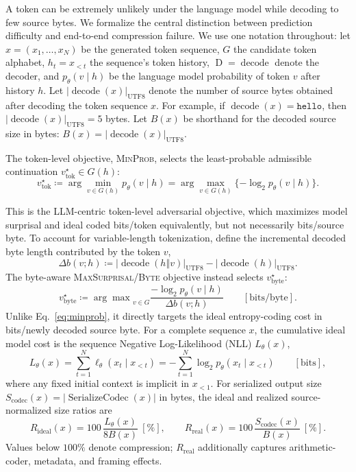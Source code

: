 \documentclass{article}
\newcommand{\MinProb}[0]{\textsc{MinProb}}
\newcommand{\MaxSurprisal}[0]{\textsc{MaxSurprisal/Byte}}
\newcommand{\bytes}[1]{\lvert #1\rvert_{\mathrm{UTF8}}}
\newcommand{\vtok}{v^\star_{\mathrm{tok}}}
\newcommand{\vbyte}{v^\star_{\mathrm{byte}}}
\newcommand{\Dec}{\operatorname{D}}
\newcommand{\Ser}{\operatorname{SerializeCodec}}
\begin{document}
A token can be extremely unlikely under the language model while decoding to few source bytes. We formalize the central distinction between prediction difficulty and end-to-end compression failure. We use one notation throughout: let $x=(x_1,\ldots,x_N)$ be the generated token sequence, $G$ the candidate token alphabet, $h_t=x_{<t}$ the sequence's token history, $\Dec = \operatorname{decode}$ denote the decoder, and $p_\theta(v\mid h)$ be the language model probability of token $v$ after history $h$. Let $\bytes{\operatorname{decode}(x)}$ denote the number of source bytes obtained after decoding the token sequence $x$. For example, if $\operatorname{decode}(x)=\texttt{hello}$, then $\bytes{\operatorname{decode}(x)}=5$ bytes.
Let $B(x)$ be shorthand for the decoded source size in bytes: $B(x) = \bytes{\operatorname{decode}(x)}.$

The token-level objective, \MinProb{}, selects the least-probable admissible continuation $\vtok \in G(h)$:
\begin{equation}
  \vtok \coloneq
     \arg\min_{v\in G(h)} p_\theta(v\mid h)
  = \arg\max_{v\in G(h)}
    \{-\log_2 p_\theta(v\mid h)\}.
  \label{eq:minprob}
\end{equation}

This is the LLM-centric token-level adversarial objective, which maximizes model surprisal and ideal coded bits/token equivalently, but not necessarily bits/source byte. To account for variable-length tokenization, define the incremental decoded byte length contributed by the token $v$,
\begin{equation}
  \Delta b(v;h) \coloneq
  \bytes{\operatorname{decode}(h\mathbin\Vert v)}-
  \bytes{\operatorname{decode}(h)}.
\end{equation}
The byte-aware \MaxSurprisal{} objective instead selects $\vbyte$:
\begin{equation}
  \vbyte \coloneq {\arg \max}_{v\in G}
  \frac{-\log_2 p_\theta(v\mid h)}{\Delta b(v;h)}  \qquad [\mathrm{bits/byte}].
  \label{eq:spb}
\end{equation}
Unlike Eq.~\eqref{eq:minprob}, it directly targets the ideal entropy-coding cost in bits/newly decoded source byte.
For a complete sequence $x$, the cumulative ideal model cost is the sequence Negative Log-Likelihood (NLL) $L_\theta(x)$,
\begin{equation}
  L_\theta(x)
  =
  \sum_{t=1}^{N}
  \ell_\theta(x_t\mid x_{<t})
  =
  -\sum_{t=1}^{N}\log_2 p_\theta(x_t\mid x_{<t})
  \qquad [\mathrm{bits}],
  \label{eq:nll}
\end{equation}
where any fixed initial context is implicit in $x_{<1}$. For serialized output
size $S_{\mathrm{codec}}(x)=\left|\Ser(x)\right|$ in bytes, the ideal and
realized source-normalized size ratios are
\begin{equation}
  R_{\mathrm{ideal}}(x)=100\,\frac{L_\theta(x)}{8B(x)}\ [\%],
  \qquad
  R_{\mathrm{real}}(x)=100\,\frac{S_{\mathrm{codec}}(x)}{B(x)}\ [\%].
  \label{eq:size-ratios}
\end{equation}
Values below $100\%$ denote compression; $R_{\mathrm{real}}$ additionally
captures arithmetic-coder, metadata, and framing effects.
\end{document}
